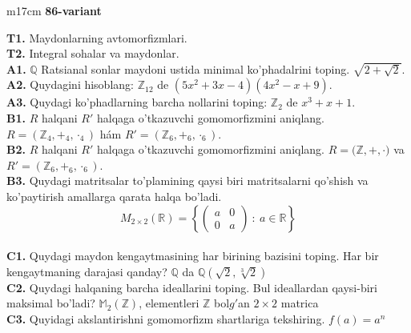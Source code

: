 \documentclass{article}
\begin{document}
\begin{tabular}{m{17cm}}
\textbf{86-variant}
\newline

\textbf{T1.} Maydonlarning avtomorfizmlari. \\
\textbf{T2.} Integral sohalar va maydonlar. \\
\textbf{A1.} \(\mathbb{Q}\) Ratsianal sonlar maydoni ustida minimal ko'phadalrini toping.
\(\sqrt{2 + \sqrt{2}}\). \\
\textbf{A2.} Quydagini hisoblang:
\(\mathbb{Z}_{12}\) de \(\left( 5x^{2} + 3x - 4 \right)\left( 4x^{2} - x + 9 \right)\). \\
\textbf{A3.} Quydagi ko'phadlarning barcha nollarini toping:
\(\mathbb{Z}_{2}\) de \(x^{3} + x + 1\). \\
\textbf{B1.} \(R\) halqani \(R'\) halqaga o'tkazuvchi gomomorfizmini aniqlang.
\(R = (\mathbb{Z}_{4}, +_{4}, \cdot_{4})\) hám \(R' = (\mathbb{Z}_{6}, +_{6}, \cdot_{6})\). \\
\textbf{B2.} \(R\) halqani \(R'\) halqaga o'tkazuvchi gomomorfizmini aniqlang.
\(R\mathbb{= (Z,} + , \cdot )\) va \(R' = (\mathbb{Z}_{6}, +_{6}, \cdot_{6})\). \\
\textbf{B3.} Quydagi matritsalar to'plamining qaysi biri matritsalarni qo'shish va ko'paytirish amallarga qarata halqa bo'ladi.
\[M_{2 \times 2}\mathbb{(R) =}\left\{ \begin{pmatrix}
a & 0 \\
0 & a
\end{pmatrix}\ :\ a \in \mathbb{R} \right\}\] \\
\textbf{C1.} Quydagi maydon kengaytmasining har birining bazisini toping. Har bir kengaytmaning darajasi qanday?
\(\mathbb{Q}\) da \(\mathbb{Q}\left( \sqrt{2},\sqrt[3]{2} \right)\) \\
\textbf{C2.} Quydagi halqaning barcha ideallarini toping. Bul ideallardan qaysi-biri maksimal bo'ladi?
\(\mathbb{M}_{2}\left( \mathbb{Z} \right)\), elementleri \(\mathbb{Z}\) bol\(g'\)an \(2 \times 2\) matrica \\
\textbf{C3.} Quyidagi akslantirishni gomomorfizm shartlariga tekshiring. \(f(a) = a^{n}\) \\

\end{tabular}
\vspace{1cm}
\end{document}
